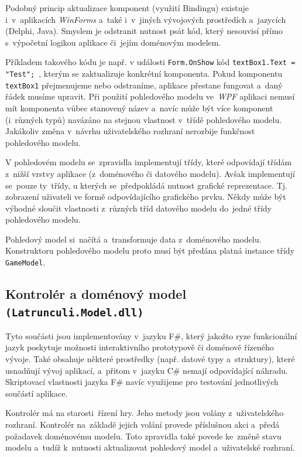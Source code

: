 \documentclass[12pt]{article}
\begin{document}
Podobný princip aktualizace komponent (využití Bindingu) existuje i~v~aplikacích \emph{WinForms} a~také i~v~jiných vývojových prostředích a~jazycích (Delphi, Java). Smyslem je odstranit nutnost psát kód, který nesouvisí přímo s~výpočetní logikou aplikace či~jejím doménovým modelem.

Příkladem takového kódu je např. v události \texttt{Form.OnShow} kód \texttt{textBox1.Text = "Test"; }, kterým se zaktualizuje konkrétní komponenta. Pokud komponentu \texttt{textBox1} přejmenujeme nebo odstraníme, aplikace přestane fungovat a~daný řádek musíme upravit. Při použití pohledového modelu ve~\emph{WPF} aplikaci nemusí mít komponenta vůbec stanovený název a~navíc může být více komponent (i~různých typů) navázáno na stejnou vlastnost v~třídě pohledového modelu. Jakákoliv změna v~návrhu uživatelského rozhraní nerozbije funkčnost pohledového modelu.

V pohledovém modelu se~zpravidla implementují třídy, které odpovídají třídám z~nižší vrstvy aplikace (z~doménového či datového modelu). Avšak implementují se~pouze ty~třídy, u kterých se~předpokládá nutnost grafické reprezentace. Tj. zobrazení uživateli ve formě odpovídajícího grafického prvku. Někdy může být výhodné sloučit vlastnosti z~různých tříd datového modelu do~jedné třídy pohledového modelu.

Pohledový model si~načítá a~transformuje data z~doménového modelu. Konstruktoru pohledového modelu proto musí být předána platná instance třídy \texttt{GameModel}.

\subsection{Kontrolér a doménový model \texttt{(Latrunculi.Model.dll)}}
Tyto součásti jsou implementovány v~jazyku F\#, který jakožto ryze funkcionální jazyk poskytuje možnosti interaktivního prototypově či doménově řízeného vývoje. Také obsahuje některé prostředky (např. datové typy a~struktury), které usnadňují vývoj aplikací, a~přitom v~jazyku C\# nemají odpovídající náhradu. Skriptovací vlastnosti jazyka F\# navíc využijeme pro testování jednotlivých součástí aplikace.

Kontrolér má na starosti~řízení hry. Jeho metody jsou volány z~uživatelského rozhraní. Kontrolér na~základě jejich volání provede příslušnou akci a~předá požadavek doménovému modelu. Toto zpravidla také povede ke~změně stavu modelu a~tudíž k~nutnosti aktualizovat pohledový model a~uživatelské rozhraní.
\end{document}
